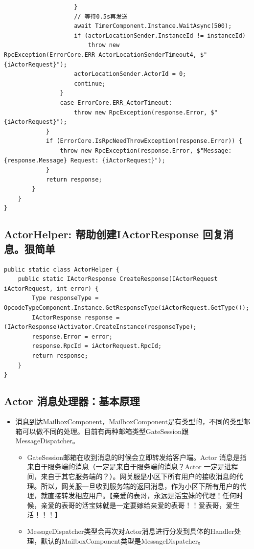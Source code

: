 \documentclass[9pt, b5paper]{article}
\begin{document}
\begin{verbatim}
                    }
                    // 等待0.5s再发送
                    await TimerComponent.Instance.WaitAsync(500);
                    if (actorLocationSender.InstanceId != instanceId)
                        throw new RpcException(ErrorCore.ERR_ActorLocationSenderTimeout4, $"{iActorRequest}");
                    actorLocationSender.ActorId = 0;
                    continue;
                }
                case ErrorCore.ERR_ActorTimeout: 
                    throw new RpcException(response.Error, $"{iActorRequest}");
            }
            if (ErrorCore.IsRpcNeedThrowException(response.Error)) {
                throw new RpcException(response.Error, $"Message: {response.Message} Request: {iActorRequest}");
            }
            return response;
        }
    }
}
\end{verbatim}
\subsection{ActorHelper: 帮助创建IActorResponse 回复消息。狠简单}
\label{sec-2-10}
\begin{verbatim}
public static class ActorHelper {
    public static IActorResponse CreateResponse(IActorRequest iActorRequest, int error) {
        Type responseType = OpcodeTypeComponent.Instance.GetResponseType(iActorRequest.GetType());
        IActorResponse response = (IActorResponse)Activator.CreateInstance(responseType);
        response.Error = error;
        response.RpcId = iActorRequest.RpcId;
        return response;
    }
}
\end{verbatim}
\subsection{Actor 消息处理器：基本原理}
\label{sec-2-11}
\begin{itemize}
\item 消息到达MailboxComponent，MailboxComponent是有类型的，不同的类型邮箱可以做不同的处理。目前有两种邮箱类型GateSession跟MessageDispatcher。
\begin{itemize}
\item GateSession邮箱在收到消息的时候会立即转发给客户端。Actor 消息是指来自于服务端的消息（一定是来自于服务端的消息？Actor 一定是进程间，来自于其它服务端的？）。网关服是小区下所有用户的接收消息的代理。所以，网关服一旦收到服务端的返回消息，作为小区下所有用户的代理，就直接转发相应用户。【亲爱的表哥，永远是活宝妹的代理！任何时候，亲爱的表哥的活宝妹就是一定要嫁给亲爱的表哥！！爱表哥，爱生活！！！】
\item MessageDispatcher类型会再次对Actor消息进行分发到具体的Handler处理，默认的MailboxComponent类型是MessageDispatcher。
\end{itemize}
\end{itemize}
\end{document}
